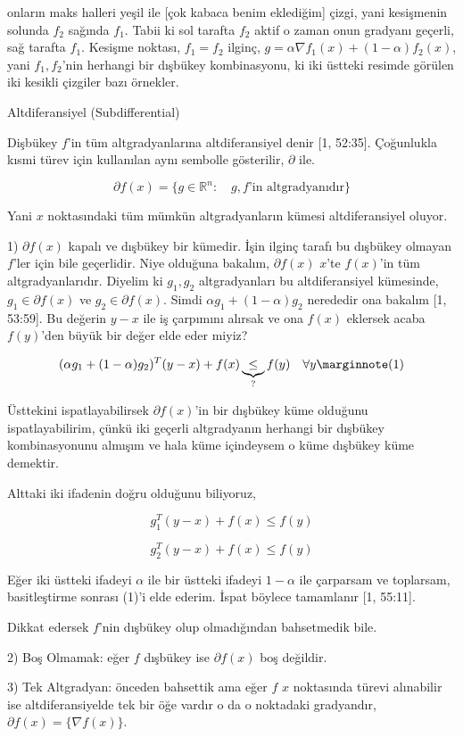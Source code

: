 \documentclass[12pt,fleqn]{article}\usepackage{../../common}
\begin{document}
onların maks halleri yeşil ile [çok kabaca benim eklediğim] çizgi, yani
kesişmenin solunda $f_2$ sağında $f_1$. Tabii ki sol tarafta $f_2$ aktif o
zaman onun gradyanı geçerli, sağ tarafta $f_1$. Kesişme noktası, $f_1=f_2$
ilginç, $g = \alpha \nabla f_1(x) + (1-\alpha) f_2(x)$, yani $f_1,f_2$'nin
herhangi bir dışbükey kombinasyonu, ki iki üstteki resimde görülen iki
kesikli çizgiler bazı örnekler. 

Altdiferansiyel (Subdifferential)

Dişbükey $f$'in tüm altgradyanlarına altdiferansiyel denir [1,
52:35]. Çoğunlukla kısmi türev için kullanılan aynı sembolle gösterilir,
$\partial$ ile.

$$
\partial f(x) = \{ 
g \in \mathbb{R}^n: \quad g, f\textrm{'in altgradyanıdır}
\}
$$

Yani $x$ noktasındaki tüm mümkün altgradyanların kümesi altdiferansiyel
oluyor. 

1) $\partial f(x)$ kapalı ve dışbükey bir kümedir. İşin ilginç tarafı bu
dışbükey olmayan $f$'ler için bile geçerlidir. Niye olduğuna bakalım,
$\partial f(x)$ $x$'te $f(x)$'in tüm altgradyanlarıdır. Diyelim ki
$g_1,g_2$ altgradyanları bu altdiferansiyel kümesinde, $g_1 \in \partial
f(x)$ ve $g_2 \in \partial f(x)$. Simdi $\alpha g_1 + (1-\alpha) g_2$
nerededir ona bakalım [1, 53:59]. Bu değerin $y-x$ ile iş çarpımını alırsak
ve ona $f(x)$ eklersek acaba $f(y)$'den büyük bir değer elde eder miyiz?

$$
(\alpha g_1 + (1-\alpha) g_2)^T (y-x) + f(x) 
\underbrace{\le}_{?} f(y) \quad \forall y
\mlabel{1}
$$

Üsttekini ispatlayabilirsek $\partial f(x)$'in bir dışbükey küme olduğunu
ispatlayabilirim, çünkü iki geçerli altgradyanın herhangi bir dışbükey
kombinasyonunu almışım ve hala küme içindeysem o küme dışbükey küme
demektir. 

Alttaki iki ifadenin doğru olduğunu biliyoruz, 

$$
 g_1^T (y-x) + f(x) \le f(y) 
$$

$$
 g_2^T (y-x) + f(x) \le f(y) 
$$

Eğer iki üstteki ifadeyi $\alpha$ ile bir üstteki ifadeyi $1-\alpha$ ile
çarparsam ve toplarsam, basitleştirme sonrası (1)'i elde ederim. İspat
böylece tamamlanır [1, 55:11].

Dikkat edersek $f$'nin dışbükey olup olmadığından bahsetmedik bile. 

2) Boş Olmamak: eğer $f$ dışbükey ise $\partial f(x)$ boş değildir.

3) Tek Altgradyan: önceden bahsettik ama eğer $f$ $x$ noktasında türevi
alınabilir ise altdiferansiyelde tek bir öğe vardır o da o noktadaki
gradyandır, $\partial f(x) = \{ \nabla f(x) \}$. 
\end{document}
